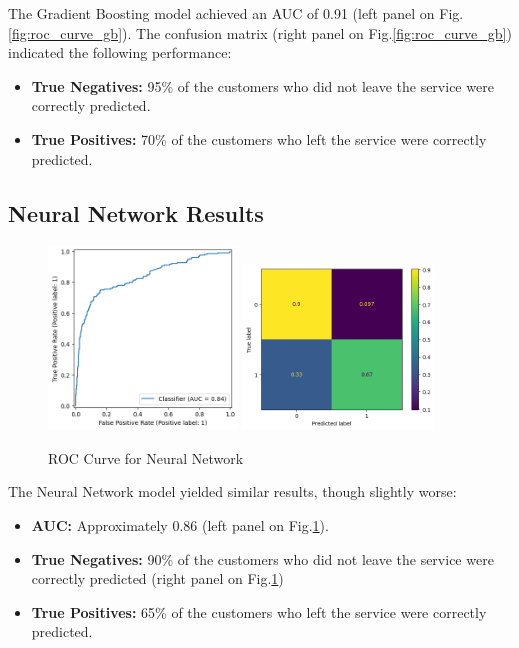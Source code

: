 \documentclass[12pt]{article}
\begin{document}
The Gradient Boosting model achieved an AUC of 0.91 (left panel on Fig.\ref{fig:roc_curve_gb}). The confusion matrix (right panel on Fig.\ref{fig:roc_curve_gb}) indicated the following performance:
\begin{itemize}
    \item \textbf{True Negatives:} 95\% of the customers who did not leave the service were correctly predicted.
    \item \textbf{True Positives:} 70\% of the customers who left the service were correctly predicted.
\end{itemize}

\subsection{Neural Network Results}

\begin{figure}[h!]
    \centering
    \includegraphics[width=0.45\textwidth]{figures/roc_curve_nn.png}
    \includegraphics[width=0.45\textwidth]{figures/confusion_matrix_nn.png}
    \caption{ROC Curve for Neural Network}
    \label{fig:roc_curve_nn}
\end{figure}

The Neural Network model yielded similar results, though slightly worse:
\begin{itemize}
    \item \textbf{AUC:} Approximately 0.86 (left panel on Fig.\ref{fig:roc_curve_nn}).
    \item \textbf{True Negatives:} 90\% of the customers who did not leave the service were correctly predicted (right panel on Fig.\ref{fig:roc_curve_nn})
    \item \textbf{True Positives:} 65\% of the customers who left the service were correctly predicted.
\end{itemize}
\end{document}
